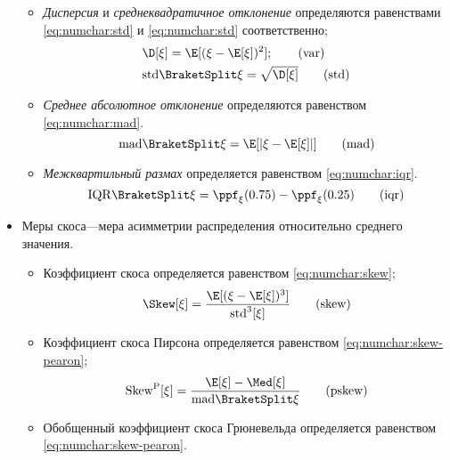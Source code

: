 \begin{itemize}
        \begin{itemize}[noitemsep, parsep=0pt,topsep=0pt]
            \item \emph{Дисперсия} и \emph{среднеквадратичное отклонение} определяются равенствами \eqref{eq:numchar:std} и \eqref{eq:numchar:std} соответственно;
            \begin{align}    
                \label{eq:numchar:var}
                &\D[\xi] = \E[(\xi - \E[\xi])^2]; \tag{var}\\
                \label{eq:numchar:std}
                &\std[\xi] = \sqrt{\D[\xi]} \tag{std}
            \end{align}
            \item \emph{Среднее абсолютное отклонение} определяются равенством \eqref{eq:numchar:mad}.
            \begin{equation}
                \label{eq:numchar:mad}
                \mad[\xi] = \E[\abs{\xi - \E[\xi]}] \tag{mad}
            \end{equation}
            \item \emph{Межквартильный размах} определяется равенством \eqref{eq:numchar:iqr}.
            \begin{equation}
                \label{eq:numchar:iqr}
                \IQR[\xi] = \ppf_{\xi}(0.75) - \ppf_\xi(0.25) \tag{iqr}
            \end{equation}
        \end{itemize} 
    \item Меры скоса---мера асимметрии распределения относительно среднего значения.
    \begin{itemize}[noitemsep, parsep=0pt,topsep=0pt]
        \item Коэффициент скоса определяется равенством \eqref{eq:numchar:skew};
        \begin{equation}
            \label{eq:numchar:skew} 
            \Skew[\xi] = \frac{\E[(\xi - \E[\xi])^3]}{\std^3[\xi]} \tag{skew}
        \end{equation}
        \item Коэффициент скоса Пирсона определяется равенством \eqref{eq:numchar:skew-pearon};
        \begin{equation}
            \label{eq:numchar:skew-pearon} 
            \mathrm{Skew}^{\mathrm{P}}[\xi] = \frac{\E[\xi] - \Med[\xi]}{\mad[\xi]} \tag{pskew}
        \end{equation}
        \item Обобщенный коэффициент скоса Грюневельда определяется равенством \eqref{eq:numchar:skew-pearon}.

\end{itemize}
\end{itemize}
